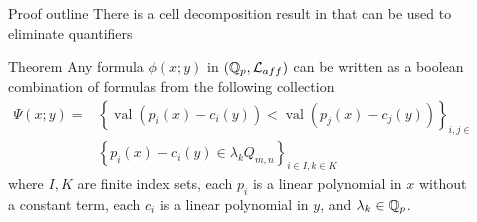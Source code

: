 \documentclass[final]{beamer}
\newcommand{\curly}[1]{\left\{ #1 \right\}}
\DeclareMathOperator{\vval}{val}
\newlength{\sepwid}
\newlength{\onecolwid}
\begin{document}
\begin{frame}[t]
\begin{columns}[t]
\begin{column}{\onecolwid}
\end{column} %

\begin{column}{\sepwid}\end{column} %

\begin{column}{\onecolwid}
     
    \begin{block}{Proof outline}
        There is a cell decomposition result in \cite{reduct} that can be used to eliminate quantifiers
        \begin{alertblock} {Theorem}
            Any formula $\phi(x; y)$ in $(\mathbb{Q}_p, \mathcal L_{aff})$ can be written as a boolean combination of formulas from the following collection
            \begin{align*}
                    \Psi(x; y) = &\curly{\vval (p_i(x) - c_i(y)) < \vval (p_j(x) - c_j(y))}_{i, j \in I} \cup \\
                    &\curly{p_i(x) - c_i(y) \in \lambda_k Q_{m,n}}_{i \in I , k \in K}
            \end{align*}
            where $I, K$ are finite index sets,
            each $p_i$ is a linear polynomial in $x$ without a constant term,
            each $c_i$ is a linear polynomial in $y$, and
            $\lambda_k \in \mathbb{Q}_p$.
        \end{alertblock}


\end{block}
\end{column}
\end{columns}
\end{frame}
\end{document}

